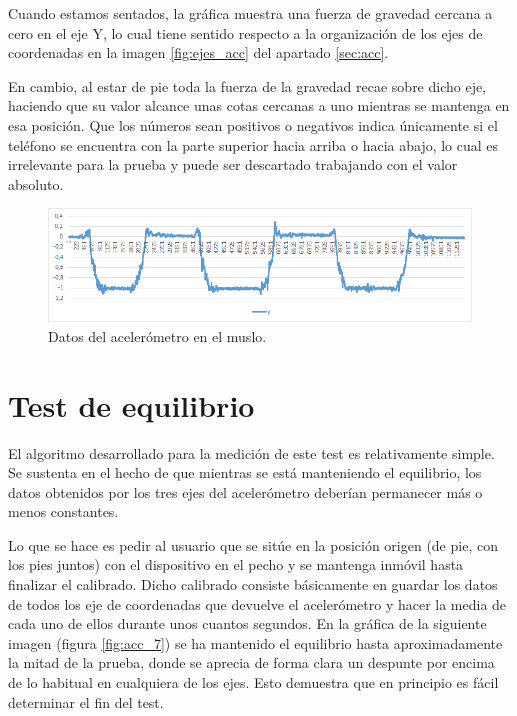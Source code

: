 Cuando estamos sentados, la gráfica muestra una fuerza de gravedad cercana a cero en el eje Y, lo cual tiene sentido respecto a la organización de los ejes de coordenadas en la imagen \ref{fig:ejes_acc} del apartado \ref{sec:acc}.

En cambio, al estar de pie toda la fuerza de la gravedad recae sobre dicho eje, haciendo que su valor alcance unas cotas cercanas a uno mientras se mantenga en esa posición. Que los números sean positivos o negativos indica únicamente si el teléfono se encuentra con la parte superior hacia arriba o hacia abajo, lo cual es irrelevante para la prueba y puede ser descartado trabajando con el valor absoluto.

\begin{figure}[H]
	\centering
	\includegraphics[scale=0.6]{imagenes/grafico_y_muslo.png}
	\caption{Datos del acelerómetro en el muslo.\label{fig:acc_muslo}}
\end{figure}

\section{Test de equilibrio}

El algoritmo desarrollado para la medición de este test es relativamente simple. Se sustenta en el hecho de que mientras se está manteniendo el equilibrio, los datos obtenidos por los tres ejes del acelerómetro deberían permanecer más o menos constantes. 

Lo que se hace es pedir al usuario que se sitúe en la posición origen (de pie, con los pies juntos) con el dispositivo en el pecho y se mantenga inmóvil hasta finalizar el calibrado. Dicho calibrado consiste básicamente en guardar los datos de todos los eje de coordenadas que devuelve el acelerómetro y hacer la media de cada uno de ellos durante unos cuantos segundos. En la gráfica de la siguiente imagen (figura \ref{fig:acc_7}) se ha mantenido el equilibrio hasta aproximadamente la mitad de la prueba, donde se aprecia de forma clara un despunte por encima de lo habitual en cualquiera de los ejes. Esto demuestra que en principio es fácil determinar el fin del test.

